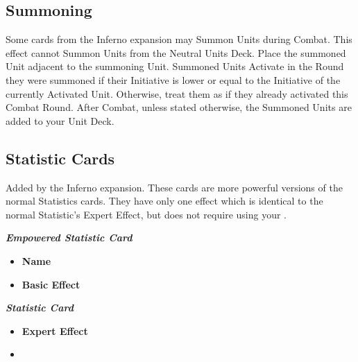\begin{multicols*}{2}
\subsection*{Summoning}
Some cards from the Inferno expansion may Summon Units during Combat.
This effect cannot Summon Units from the Neutral Units Deck.
Place the summoned Unit adjacent to the summoning Unit.
Summoned Units Activate in the Round they were summoned if their Initiative is lower or equal to the Initiative of the currently Activated Unit.
Otherwise, treat them as if they already activated this Combat Round.
After Combat, unless stated otherwise, the Summoned Units are added to your Unit Deck.

\subsection*{ Statistic Cards}
Added by the Inferno expansion.
These cards are more powerful versions of the normal Statistics cards.
They have only one effect which is identical to the normal Statistic's Expert Effect, but does not require using your .

\begin{scriptsize}
\end{scriptsize}
\vspace{-2em}
\begin{multicols}{2}
  \centering
  \footnotesize{\textbf{\textit{\textcolor{darkcandyapplered}{Empowered Statistic Card}}}}
  \scriptsize
  \begin{itemize}
    \item[\textbf{1.}] \textbf{Name}
    \item[\textbf{2.}] \textbf{Basic Effect}
  \end{itemize}
  \columnbreak
  \footnotesize{\textbf{\textit{\textcolor{darkcandyapplered}{Statistic Card \phantom{Empowered}}}}}
  \scriptsize
  \begin{itemize}
    \item[\textbf{3.}] \textbf{Expert Effect}
    \item[\textbf{\phantom{.}}] \phantom{.}
  \end{itemize}
\end{multicols}


\end{multicols*}
